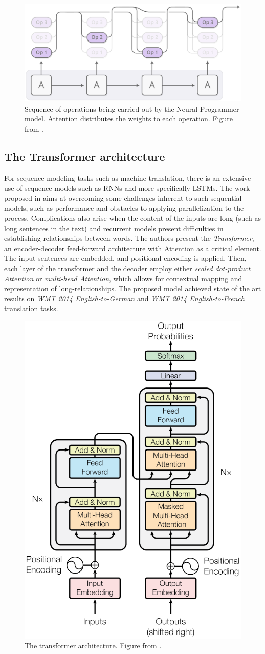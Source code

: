 \documentclass[12pt]{article}
\begin{document}
\begin{figure}
\begin{center}
    \includegraphics[width=0.5\linewidth]{./img/neural-programmer.png}
\caption{
    Sequence of operations being carried out by the Neural Programmer model.
    Attention distributes the weights to each operation.
    Figure from \cite{ref:distill}.
}
\label{fig:np}
\end{center}
\end{figure}

\subsection{The Transformer architecture}
For sequence modeling tasks such
as machine translation, there is an extensive use of sequence models such as RNNs and more specifically LSTMs.
The work proposed in \cite{ref:transformer} aims at overcoming some challenges inherent to such sequential
models, such as performance and obstacles to applying parallelization to the process.
Complications also arise when the content of the inputs are long (such as long sentences in the text) and
recurrent models present difficulties in establishing relationships between words.
The authors present the \emph{Transformer}, an encoder-decoder feed-forward architecture with Attention as a critical element.
The input sentences are embedded, and positional encoding is applied.
Then, each layer of the transformer and the decoder employ either \emph{scaled dot-product Attention} or
\emph{multi-head Attention}, which allows for contextual mapping and representation of long-relationships.
The proposed model achieved state of the art results on \emph{WMT 2014 English-to-German} and
\emph{WMT 2014 English-to-French} translation tasks.

\begin{figure}
\begin{center}
    \includegraphics[width=0.4\linewidth]{./img/transformer.png}
\caption{
    The transformer architecture.
    Figure from \cite{ref:transformer}.
}
\label{fig:transformer}
\end{center}
\end{figure}
\end{document}
